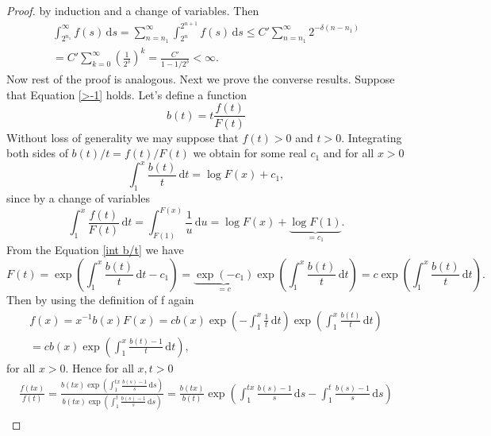 \documentclass[english,12pt,a4paper,pdftex,sci,utf8]{aaltothesis} %
\begin{document}
\begin{proof}
by induction and a change of variables. Then
\begin{equation*}
\begin{split}
\int_{2^{n_1}}^{\infty} f(s)\,\mathrm{d}s = \sum_{n=n_1}^{\infty} \int_{2^{n}}^{2^{n+1}} f(s)\,\mathrm{d}s \leq C' \sum_{n=n_1}^{\infty} 2^{-\delta(n-n_1)} \\
=C' \sum_{k=0}^{\infty} \left( \frac{1}{2^{\delta}}\right)^k = \frac{C'}{1-1/2^{\delta}}<\infty.
\end{split}
\end{equation*}
Now rest of the proof is analogous. Next we prove the converse results. Suppose that Equation \eqref{>-1} holds. Let's define a function
\begin{equation*}
b(t) = t\frac{f(t)}{F(t)}
\end{equation*}
Without loss of generality we may suppose that $f(t)>0$ and $t>0$. Integrating both sides of $b(t)/t=f(t)/F(t)$ we obtain for some real $c_1$ and for all $x>0$
\begin{equation}
\int_{1}^{x} \frac{b(t)}{t}\,\mathrm{d}t = \log F(x) + c_1,
\label{int b/t}
\end{equation}
since by a change of variables
\begin{equation*}
\int_{1}^{x} \frac{f(t)}{F(t)}\,\mathrm{d}t = \int_{F(1)}^{F(x)} \frac{1}{u}\,\mathrm{d}u = \log F(x) + \underbrace{\log F(1)}_{=c_1}.
\end{equation*}
From the Equation \eqref{int b/t} we have
\begin{equation*}
F(t) = \exp \left( \int_1^x \frac{b(t)}{t}\,\mathrm{d}t-c_1 \right) =\underbrace{\exp(-c_1)}_{=c} \exp \left( \int_1^x \frac{b(t)}{t}\,\mathrm{d}t\right) =c \exp \left( \int_1^x \frac{b(t)}{t}\,\mathrm{d}t\right).
\end{equation*}
Then by using the definition of f again
\begin{equation}
\begin{split}
f(x)=x^{-1}b(x)F(x)=cb(x)\exp \left( -\int_1^x \frac{1}{t} \,\mathrm{d}t\right) \exp \left( \int_1^x \frac{b(t)}{t} \,\mathrm{d}t\right)\\
=cb(x)\exp \left( \int_1^x \frac{b(t)-1}{t}\,\mathrm{d}t\right),
\label{frep}
\end{split}
\end{equation}
for all $x>0$. Hence for all $x,t>0$
\begin{equation*}
\begin{split}
\frac{f(tx)}{f(t)}=\frac{b(tx)\exp \left( \int_1^{tx} \frac{b(s)-1}{s}\,\mathrm{d}s\right)}{b(tx)\exp \left( \int_1^{t} \frac{b(s)-1}{s}\,\mathrm{d}s\right)} = \frac{b(tx)}{b(t)} \exp \left( \int_1^{tx} \frac{b(s)-1}{s}\,\mathrm{d}s - \int_1^{t} \frac{b(s)-1}{s}\,\mathrm{d}s\right) \\

\end{split}
\end{equation*}
\end{proof}
\end{document}
